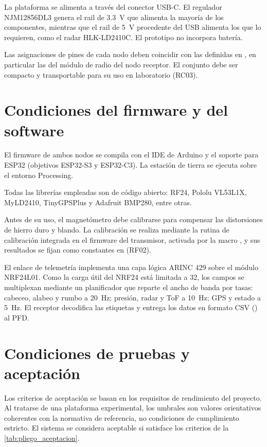 La plataforma se alimenta a través del conector USB-C. El regulador NJM12856DL3 genera el rail de \SI{3.3}{\volt} que alimenta la mayoría de los componentes, mientras que el rail de \SI{5}{\volt} procedente del USB alimenta los que lo requieren, como el radar HLK-LD2410C. El prototipo no incorpora batería.

Las asignaciones de pines de cada nodo deben coincidir con las definidas en , en particular las del módulo de radio del nodo receptor. El conjunto debe ser compacto y transportable para su uso en laboratorio (RC03).


\chapter{Condiciones del firmware y del software}
\label{ch:pliego_firmware}

El firmware de ambos nodos se compila con el IDE de Arduino y el soporte para ESP32 (objetivos ESP32-S3 y ESP32-C3). La estación de tierra se ejecuta sobre el entorno Processing.

Todas las librerías empleadas son de código abierto: RF24, Pololu VL53L1X, MyLD2410, TinyGPSPlus y Adafruit BMP280, entre otras. 

Antes de su uso, el magnetómetro debe calibrarse para compensar las distorsiones de hierro duro y blando. La calibración se realiza mediante la rutina de calibración integrada en el firmware del transmisor, activada por la macro , y sus resultados se fijan como constantes  en  (RF02).

El enlace de telemetría implementa una capa lógica ARINC 429 sobre el módulo NRF24L01. Como la carga útil del NRF24 está limitada a \SI{32}{\byte}, los campos se multiplexan mediante un planificador que reparte el ancho de banda por tasas: cabeceo, alabeo y rumbo a \SI{20}{\hertz}; presión, radar y ToF a \SI{10}{\hertz}; GPS y estado a \SI{5}{\hertz}. El receptor decodifica las etiquetas y entrega los datos en formato CSV () al PFD. 


\chapter{Condiciones de pruebas y aceptación}
\label{ch:pliego_aceptacion}

Los criterios de aceptación se basan en los requisitos de rendimiento del proyecto. Al tratarse de una plataforma experimental, los umbrales son valores orientativos coherentes con la normativa de referencia, no condiciones de cumplimiento estricto. El sistema se considera aceptable si satisface los criterios de la \cref{tab:pliego_aceptacion}.

